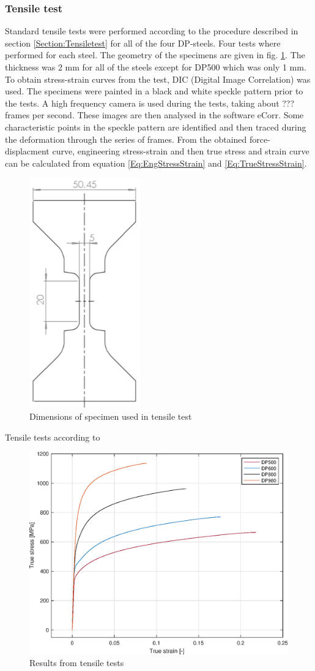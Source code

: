 \documentclass{article}
\begin{document}
\subsubsection{Tensile test}
Standard tensile tests were performed according to the procedure described in section \ref{Section:Tensiletest} for all of the four DP-steels. Four tests where performed for each steel. The geometry of the specimens are given in fig. \ref{fig:SpecimenDim}. The thickness was 2 mm for all of the steels except for DP500 which was only 1 mm. To obtain stress-strain curves from the test, DIC (Digital Image Correlation) was used. The specimens were painted in a black and white speckle pattern prior to the tests. A high frequency camera is used during the tests, taking about ??? frames per second. These images are then analysed in the software eCorr. Some characteristic points in the speckle pattern are identified and then traced during the deformation through the series of frames. From the obtained force-displacment curve, engineering stress-strain and then true stress and strain curve can be calculated from equation \ref{Eq:EngStressStrain} and \ref{Eq:TrueStressStrain}. 
\begin{figure}[h!]
\centering
    \includegraphics[width=0.3\linewidth]{SpecimenDim.png}
    \caption{Dimensions of specimen used in tensile test}
    \label{fig:SpecimenDim}
\end{figure}

Tensile tests according to 
\begin{figure}[h!]
\centering
    \includegraphics[width=0.8\linewidth]{Experimental.eps}
    \caption{Results from tensile tests}
    \label{fig:TensiletestResult}
\end{figure}
\end{document}
